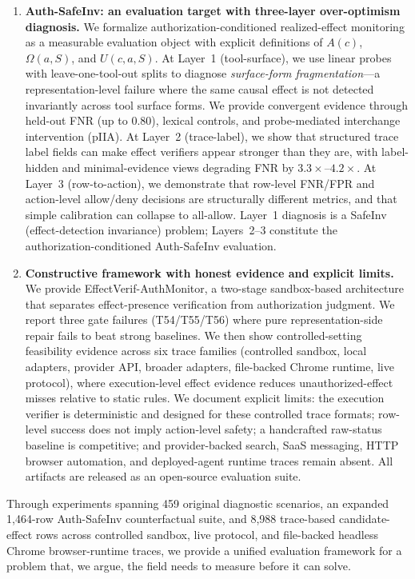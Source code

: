 \documentclass{article}
\begin{document}
\begin{enumerate}
    \item \textbf{Auth-SafeInv: an evaluation target with three-layer over-optimism diagnosis.} We formalize authorization-conditioned realized-effect monitoring as a measurable evaluation object with explicit definitions of $A(c)$, $\Omega(a,S)$, and $U(c,a,S)$. At Layer~1 (tool-surface), we use linear probes with leave-one-tool-out splits to diagnose \emph{surface-form fragmentation}---a representation-level failure where the same causal effect is not detected invariantly across tool surface forms. We provide convergent evidence through held-out FNR (up to $0.80$), lexical controls, and probe-mediated interchange intervention (pIIA). At Layer~2 (trace-label), we show that structured trace label fields can make effect verifiers appear stronger than they are, with label-hidden and minimal-evidence views degrading FNR by $3.3\times$--$4.2\times$. At Layer~3 (row-to-action), we demonstrate that row-level FNR/FPR and action-level allow/deny decisions are structurally different metrics, and that simple calibration can collapse to all-allow. Layer~1 diagnosis is a SafeInv (effect-detection invariance) problem; Layers~2--3 constitute the authorization-conditioned Auth-SafeInv evaluation.

    \item \textbf{Constructive framework with honest evidence and explicit limits.} We provide Effect\-Verif-Auth\-Monitor, a two-stage sandbox-based architecture that separates effect-presence verification from authorization judgment. We report three gate failures (T54/T55/T56) where pure representation-side repair fails to beat strong baselines. We then show controlled-setting feasibility evidence across six trace families (controlled sandbox, local adapters, provider API, broader adapters, file-backed Chrome runtime, live protocol), where execution-level effect evidence reduces unauthorized-effect misses relative to static rules. We document explicit limits: the execution verifier is deterministic and designed for these controlled trace formats; row-level success does not imply action-level safety; a handcrafted raw-status baseline is competitive; and provider-backed search, SaaS messaging, HTTP browser automation, and deployed-agent runtime traces remain absent. All artifacts are released as an open-source evaluation suite.
\end{enumerate}

Through experiments spanning 459 original diagnostic scenarios, an expanded 1,464-row Auth-SafeInv counterfactual suite, and 8,988 trace-based candidate-effect rows across controlled sandbox, live protocol, and file-backed headless Chrome browser-runtime traces, we provide a unified evaluation framework for a problem that, we argue, the field needs to measure before it can solve.
\end{document}
